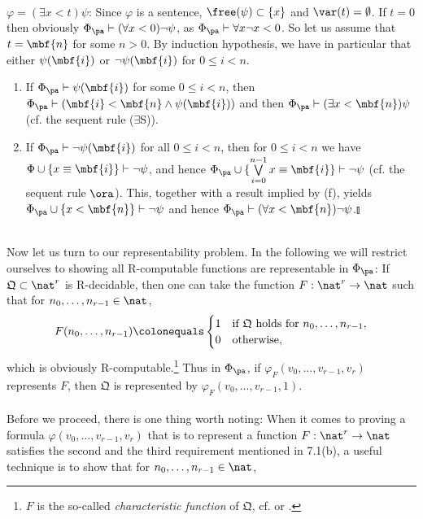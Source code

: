 \ \\
$\varphi = (\exists x < t)\psi$: Since $\varphi$ is a sentence, $\free(\psi) \subset \{ x \}$ and $\var(t) = \emptyset$. If $t = 0$ then obviously $\Phi_\pa \vdash (\forall x < 0)\neg\psi$, as $\Phi_\pa \vdash \forall x \neg x < 0$. So let us assume that $t = \mbf{n}$ for some $n > 0$. By induction hypothesis, we have in particular that either $\psi(\mbf{i})$ or $\neg\psi(\mbf{i})$ for $0 \leq i < n$.
\begin{enumerate}[(1)]
\item If $\Phi_\pa \vdash \psi(\mbf{i})$ for some $0 \leq i < n$, then $\Phi_\pa \vdash (\mbf{i} < \mbf{n} \land \psi(\mbf{i}))$ and then $\Phi_\pa \vdash (\exists x < \mbf{n}) \psi$ (cf. the sequent rule ($\exists$S)).
\item If $\Phi_\pa \vdash \neg\psi(\mbf{i})$ for all $0 \leq i < n$, then for $0 \leq i < n$ we have $\Phi \cup \{ x \equiv \mbf{i} \} \vdash \neg\psi$, and hence $\Phi_\pa \cup \{ \textstyle\bigvee\limits^{n - 1}_{i = 0} x \equiv \mbf{i}\} \vdash \neg\psi$ (cf. the sequent rule $\ora$). This, together with a result implied by (f), yields $\Phi_\pa \cup \{ x < \mbf{n} \} \vdash \neg\psi$ and hence $\Phi_\pa \vdash (\forall x < \mbf{n}) \neg\psi$.\nolinebreak\hfill$\talloblong$
\end{enumerate}
\ \\
Now let us turn to our representability problem. In the following we will restrict ourselves to showing all R-computable functions are representable in $\Phi_\pa$: If $\mathfrak{Q} \subset \nat^r$ is R-decidable, then one can take the function $F : \nat^r \to \nat$ such that for $n_0, \ldots, n_{r - 1} \in \nat$,
\[
F(n_0, \ldots, n_{r - 1}) \colonequals \begin{cases}
1 & \mbox{if \(\mathfrak{Q}\) holds for \(n_0, \ldots, n_{r - 1}\)}, \cr
0 & \mbox{otherwise},
\end{cases}
\]
which is obviously R-computable.\footnote{$F$ is the so-called \emph{characteristic function} of $\mathfrak{Q}$, cf. \cite{Dirk_van_Dalen} or \cite{Wolfgang_Rautenberg}.} Thus in $\Phi_\pa$, if $\varphi_F(v_0, \ldots, v_{r - 1}, v_r)$ represents $F$, then $\mathfrak{Q}$ is represented by $\varphi_F(v_0, \ldots, v_{r - 1}, 1)$.\\
\ \\
Before we proceed, there is one thing worth noting: When it comes to proving a formula $\varphi(v_0, \ldots, v_{r - 1}, v_r)$ that is to represent a function $F : \nat^r \to \nat$ satisfies the second and the third requirement mentioned in 7.1(b), a useful technique is to show that for $n_0, \ldots, n_{r - 1} \in \nat$,
